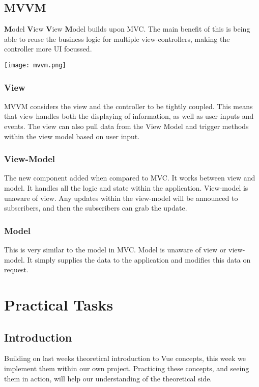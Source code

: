 \documentclass[portfolio.tex]{subfiles}
\begin{document}
					\autocite{mv-design}

			\subsection{MVVM}
				\textbf{M}odel \textbf{V}iew \textbf{V}iew \textbf{M}odel builds upon MVC. The main benefit of this is being able to reuse the business logic for multiple view-controllers, making the controller more UI focussed.


				\begin{center}
					\texttt{[image: mvvm.png]}
				\end{center}

				\subsubsection{View}
					MVVM considers the view and the controller to be tightly coupled. This means that view handles both the displaying of information, as well as user inputs and events. The view can also pull data from the View Model and trigger methods within the view model based on user input.

				\subsubsection{View-Model}
					The new component added when compared to MVC. It works between view and model. It handles all the logic and state within the application. View-model is unaware of view. Any updates within the view-model will be announced to subscribers, and then the subscribers can grab the update.

				\subsubsection{Model}
					This is very similar to the model in MVC. Model is unaware of view or view-model. It simply supplies the data to the application and modifies this data on request.\\

				\autocite{mv-design}

		\section{Practical Tasks}
			\subsection{Introduction}
				Building on last weeks theoretical introduction to Vue concepts, this week we implement them within our own project. Practicing these concepts, and seeing them in action, will help our understanding of the theoretical side.\\
\end{document}
